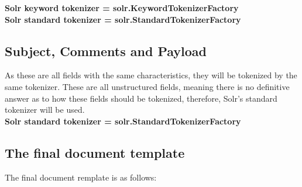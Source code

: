 \documentclass[a4paper,english]{report}
\begin{document}
\textbf{Solr keyword tokenizer = solr.KeywordTokenizerFactory}\\

\textbf{Solr standard tokenizer = solr.StandardTokenizerFactory}\\


\noindent
\subsection{Subject, Comments and Payload}
As these are all fields with the same characteristics, they will be tokenized by the same tokenizer. These are all unstructured fields, meaning there is no definitive answer as to how these fields should be tokenized, therefore, Solr’s standard tokenizer will be used.\\

\textbf{Solr standard tokenizer = solr.StandardTokenizerFactory}\\

\subsection{The final document template}
The final document remplate is as follows:
\end{document}
